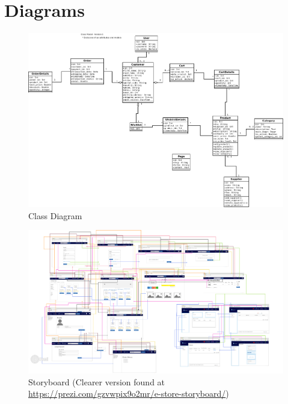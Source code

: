 \documentclass{report}
\begin{document}
\chapter{Diagrams}
\label{chap:Diagrams}
\begin{figure}[h!]
\includegraphics[width=\linewidth]{Diagrams/ClassDiagram.png}
\caption{Class Diagram}
\label{fig:ClassDiagram}
\end{figure}

\begin{figure}
\includegraphics[width=\linewidth]{Diagrams/storyboard.png}
\caption{Storyboard (Clearer version found at \url {https://prezi.com/gzvwpix9o2mr/e-store-storyboard/})}
\label{fig:Storyboard}
\end{figure}
\end{document}
